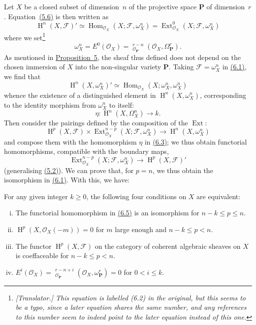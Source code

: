 \documentclass{article}
\theoremstyle{plain}
\newenvironment{theorem}[1]
  {\renewcommand\theinnertheorem{#1}\innertheorem}
  {\endinnertheorem}
\theoremstyle{definition}
\newcommand{\scr}[1]{{\mathscr{#1}}}
\newcommand{\bb}{\mathbf}
\renewcommand{\geq}{\geqslant}
\renewcommand{\leq}{\leqslant}
\DeclareMathOperator{\Ext}{Ext}
\DeclareMathOperator{\Hom}{Hom}
\DeclareMathOperator{\shExt}{\underline{Ext}}
\DeclareMathOperator{\HH}{H}
\newcommand{\oldpage}[1]{\marginpar{\footnotesize$\Big\vert$ \textit{p.~#1}}}
\begin{document}
Let $X$ be a closed subset of dimension~$n$ of the projective space $\bb{P}$ of dimension~$r$.
Equation~\hyperref[5.6]{(5.6)} is then written as
\[
\label{6.1}
  \HH^n(X,\scr{F})'
  \simeq \Hom_{\scr{O}_X}(X;\scr{F},\omega_X^n)
  = \Ext_{\scr{O}_X}^0(X;\scr{F},\omega_X^n)
\tag{6.1}
\]
where we set\footnote{\emph{[Translator.] This equation is labelled (6.2) in the original, but this seems to be a typo, since a later equation shares the same number, and any references to this number seem to indeed point to the later equation instead of this one.}}
\[
  \omega_X^n = E^0(\scr{O}_X) = \shExt_{\scr{O}_\bb{P}}^{r-n}(\scr{O}_X,\Omega_\bb{P}^r).
\]
As mentioned in \hyperref[proposition5]{Proposition~5}, the sheaf thus defined does not depend on the chosen immersion of $X$ into the non-singular variety $\bb{P}$.
Taking $\scr{F}=\omega_X^n$ in \hyperref[6.1]{(6.1)}, we find that
\[
\label{6.2}
  \HH^n(X,\omega_X^n)' \simeq \Hom_{\scr{O}_X}(X;\omega_X^n,\omega_X^n)
\tag{6.2}
\]
whence the existence of a distinguished element in $\HH^n(X,\omega_X^n)$, corresponding to the identity morphism from $\omega_X^n$ to itself:
\[
\label{6.3}
  \eta\colon \HH^n(X,\Omega_X^n) \to k.
\tag{6.3}
\]
\oldpage{149-18}
Then consider the pairings defined by the composition of the $\Ext$:
\[
\label{6.4}
  \HH^p(X,\scr{F}) \times \Ext_{\scr{O}_X}^{n-p}(X;\scr{F},\omega_X^n)
  \to \HH^n(X,\omega_X^n)
\tag{6.4}
\]
and compose them with the homomorphism $\eta$ in \hyperref[6.3]{(6.3)}; we thus obtain functorial homomorphisms, compatible with the boundary maps,
\[
\label{6.5}
  \Ext_{\scr{O}_X}^{n-p}(X;\scr{F},\omega_X^n) \to \HH^p(X,\scr{F})'
\tag{6.5}
\]
(generalising \hyperref[5.2]{(5.2)}).
We can prove that, for $p=n$, we thus obtain the isomorphism in \hyperref[6.1]{(6.1)}.
With this, we have:

\begin{theorem}{3~bis}
\label{theorem3bis}
  For any given integer $k\geq0$, the following four conditions on $X$ are equivalent:
  \begin{enumerate}[i.]
    \item The functorial homomorphism in \hyperref[6.5]{(6.5)} is an isomorphism for $n-k\leq p\leq n$.
    \item $\HH^p(X,\scr{O}_X(-m)) = 0$ for $m$ large enough and $n-k\leq p<n$.
    \item The functor $\HH^p(X,\scr{F})$ on the category of coherent algebraic sheaves on $X$ is coeffaceable for $n-k\leq p<n$.
    \item $E^i(\scr{O}_X) = \shExt_{\scr{O}_\bb{P}}^{r-n+i}(\scr{O}_X,\omega_\bb{P}^r) = 0$ for $0<i\leq k$.
  \end{enumerate}
\end{theorem}
\end{document}

